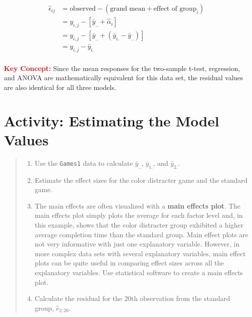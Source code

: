 \documentclass[
]{report}
\providecommand{\tightlist}{%
  \setlength{\itemsep}{0pt}\setlength{\parskip}{0pt}}
\begin{document}
\[
\begin{aligned}
\hat{\epsilon}_{ij}  
  &= \text{observed} - (\text{grand mean} + \text{effect of group}_i)\\
  &= y_{i,j} - [\bar{y}_{..} + \hat{\alpha}_i]\\
  &= y_{i,j} - [\bar{y}_{..} + (\bar{y}_{i.} - \bar{y}_{..})]\\
  &= y_{i,j} - \bar{y}_{i.}\\
\end{aligned}  
\]

\Large

\textbf{\textcolor{red}{Key Concept:}}
\color{red}
Since the mean responses for the two-sample t-test, regression, and ANOVA are mathematically equivalent for this data set, the residual values are also identical for all three models.
\color{black}
\normalsize

\hypertarget{activity-estimating-the-model-values}{%
\section*{Activity: Estimating the Model Values}\label{activity-estimating-the-model-values}}

\begin{quote}
\begin{enumerate}
\def\labelenumi{\arabic{enumi}.}
\setcounter{enumi}{18}
\tightlist
\item
  Use the \texttt{Games1} data to calculate \(\bar{y}_{..}\), \(\bar{y}_{1.}\), and \(\bar{y}_{2.}\).
\item
  Estimate the effect sizes for the color distracter game and the standard game.
\item
  The main effects are often visualized with a \textbf{main effects plot}. The main effects plot simply plots the average for each factor level and, in this example, shows that the color distracter group exhibited a higher average completion time than the standard group. Main effect plots are not very informative with just one explanatory variable. However, in more complex data sets with several explanatory variables, main effect plots can be quite useful in comparing effect sizes across all the explanatory variables. Use statistical software to create a main effects plot.
\item
  Calculate the residual for the 20th observation from the standard group, \(\hat{e}_{2, 20}\).
\end{enumerate}
\end{quote}
\end{document}
